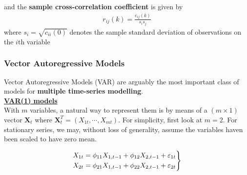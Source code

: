 and the \textbf{sample cross-correlation coefficient} is given by
\begin{align}
    r_{ij}(k)=\frac{c_{ij}(k)}{s_is_j}
\end{align}
\quad where $s_i=\sqrt{c_{ii}(0)}$ denotes the sample standard deviation of observations on the $i$th variable

\subsubsection{Vector Autoregressive Models}

Vector Autoregressive Models (VAR) are arguably the most important class of models for \textbf{multiple time-series modelling}.\\


\noindent
\textbf{\underline{VAR(1) models}}\\

With $m$ variables, a natural way to represent them is by means of a $(m\times 1)$ vector $\mathbf{X}_t$ where $\mathbf{X}_t^T=(X_{1t},\cdots, X_{mt})$. For simplicity, first look at $m=2$. For stationary series, we may, without loss of generality, assume the variables haven been scaled to have zero mean. 

\begin{equation}
\begin{array}{r@{}l}
& \left.
\begin{aligned}
    X_{1t} &= \phi_{11} X_{1,t-1} + \phi_{12} X_{2,t-1} + \varepsilon_{1t} \\
    X_{2t} &= \phi_{21} X_{1,t-1} + \phi_{22} X_{2,t-1} + \varepsilon_{2t} \label{eq9}
\end{aligned}
\right\}
\end{array}
\end{equation}


